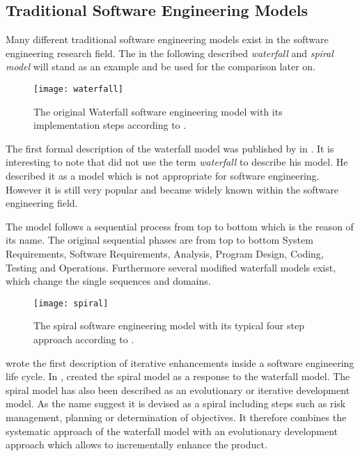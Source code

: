 \subsection{Traditional Software Engineering Models} %

Many different traditional software engineering models exist in the software
engineering research field. The in the following described \emph{waterfall} and
\emph{spiral model} will stand as an example and be used for the comparison
later on.

\begin{figure}[htbp]
  \centering
  \texttt{[image: waterfall]}
  \caption[Original Waterfall Model]
  {The original Waterfall software engineering model with its implementation
    steps according to \textcite{Royce1970}.}
\end{figure}

The first formal description of the waterfall model was published by
\textcite{Royce1970} in \citeyear{Royce1970}. It is interesting to note that
\citeauthor{Royce1970} did not use the term \emph{waterfall} to describe his
model. He described it as a model which is not appropriate for software
engineering. However it is still very popular and became widely known within
the software engineering field.

The model follows a sequential process from top to bottom which is the reason
of its name. The original sequential phases are from top to bottom System
Requirements, Software Requirements, Analysis, Program Design, Coding, Testing
and Operations. Furthermore several modified waterfall models exist, which
change the single sequences and domains.

\begin{figure}[htbp]
  \centering
  \texttt{[image: spiral]}
  \caption[Spiral Model]
  {The spiral software engineering model with its typical four step approach
    according to \textcite{Boehm1988}.}
\end{figure}

\textcite{Basili1975} wrote the first description of iterative enhancements
inside a software engineering life cycle. In \citeyear{Boehm1988},
\textcite{Boehm1988} created the spiral model as a response to the waterfall
model. The spiral model has also been described as an evolutionary or iterative
development model. As the name suggest it is devised as a spiral including
steps such as risk management, planning or determination of objectives. It
therefore combines the systematic approach of the waterfall model with an
evolutionary development approach which allows to incrementally enhance the
product.


